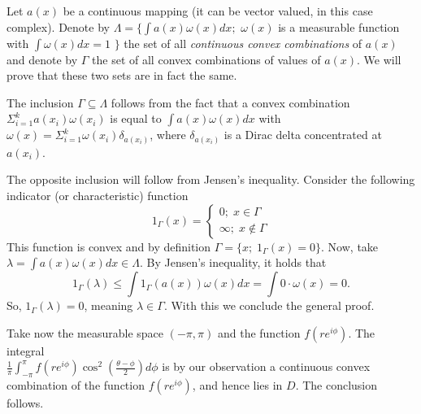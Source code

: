 \documentclass[a4paper, 12pt]{article} %
\begin{document}
\begin{enumerate}[label=(\alph*)]
	Let $a(x)$ be a continuous mapping (it can be vector valued, in this case complex). Denote by $\Lambda = \lbrace \int a(x)\omega(x)dx ;$ $\omega(x)$ is a measurable function with $\int \omega(x)dx = 1$ $\rbrace$ the set of all \textit{continuous convex combinations} of $a(x)$ and denote by $\Gamma$ the set of all convex combinations of values of $a(x)$. We will prove that these two sets are in fact the same.
	
	The inclusion $\Gamma \subseteq \Lambda$ follows from the fact that a convex combination $\Sigma_{i=1}^{k}a(x_i)\omega(x_i)$ is equal to $\int a(x)\omega(x)dx$ with $\omega(x) = \Sigma_{i=1}^k\omega(x_i)\delta_{a(x_i)}$, where $\delta_{a(x_i)}$ is a Dirac delta concentrated at $a(x_i)$.
	
	The opposite inclusion will follow from Jensen's inequality. Consider the following indicator (or characteristic) function
	\[
	1_\Gamma(x) = \begin{cases}
	0 ; \; x \in \Gamma \\
	\infty ; \; x \notin \Gamma
	\end{cases}
	\]
	This function is convex and by definition $\Gamma = \lbrace x ; \; 1_\Gamma(x) = 0 \rbrace$. Now, take $\lambda = \int a(x)\omega(x)dx \in \Lambda$. By Jensen's inequality, it holds that
	\[
	1_\Gamma(\lambda) \leq \int 1_\Gamma(a(x))\omega(x)dx = \int 0\cdot\omega(x) = 0.
	\]
	So, $1_\Gamma(\lambda) = 0$, meaning $\lambda \in \Gamma$. With this we conclude the general proof.
	
	Take now the measurable space $(-\pi, \pi)$ and the function $f(re^{i\phi})$. The integral \\ $\frac{1}{\pi} \int_{-\pi}^{\pi}f(re^{i\phi}) \cos^2\left( \frac{\theta - \phi}{2} \right) d\phi$ is by our observation a continuous convex combination of the function $f(re^{i\phi})$, and hence lies in $D$. The conclusion follows.
\end{enumerate}
\end{document}
